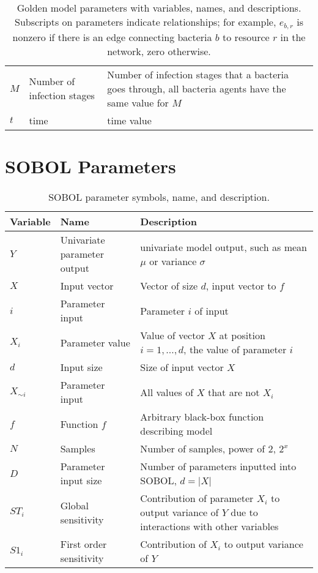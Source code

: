 \begin{table}[H]
\begin{tabularx}{\textwidth}{l l X}
        $M$ & Number of infection stages & Number of infection stages that a bacteria goes through, all bacteria agents have the same value for $M$\\
        $t$ & time & time value \\
        \bottomrule
    \end{tabularx}\newline
    \caption{
        Golden model parameters with variables, names, and descriptions. 
        Subscripts on parameters indicate relationships; for example, $e_{b, r}$ is nonzero if there is an edge connecting bacteria $b$ to resource $r$ in the network, zero otherwise.
    }
    \label{tab:parameter_table_simple_golden_model}
\end{table}


\section{SOBOL Parameters}
\begin{table}[H]
    \small %
    \centering
    \begin{tabularx}{\textwidth}{l l X}
        \toprule
        \textbf{Variable} & \textbf{Name} & \textbf{Description} \\
        \midrule
        $Y$ & Univariate parameter output & univariate model output, such as mean $\mu$ or variance $\sigma$ \\
        $X$ & Input vector & Vector of size $d$, input vector to $f$ \\
        $i$ & Parameter input & Parameter $i$ of input \\
        $X_i$ & Parameter value & Value of vector $X$ at position $i=1, \dots, d$, the value of parameter $i$ \\
        $d$ & Input size & Size of input vector $X$ \\
        $X_{\sim i}$ & Parameter input & All values of $X$ that are not $X_i$ \\
        $f$ & Function $f$ & Arbitrary black-box function describing model \\
        $N$ & Samples & Number of samples, power of 2, $2^x$ \\
        $D$ & Parameter input size & Number of parameters inputted into SOBOL, $d=|X|$ \\
        $ST_i$ & Global sensitivity & Contribution of parameter $X_i$ to output variance of $Y$ due to interactions with other variables \\
        $S1_i$ & First order sensitivity & Contribution of $X_i$ to output variance of $Y$ \\
        \bottomrule
    \end{tabularx} \newline
    \caption{
        SOBOL parameter symbols, name, and description.
    }
    \label{tab:parameter_table_SOBOL}
\end{table}

